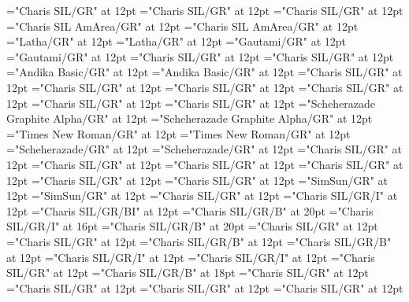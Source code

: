 \documentclass[a4paper,twoside]{article}
\begin{document}
\font\spanshhZxxxxaudio="Charis SIL/GR" at 12pt
\font\divshh="Charis SIL/GR" at 12pt
\font\spanshh="Charis SIL/GR" at 12pt
\font\divstp="Charis SIL AmArea/GR" at 12pt
\font\spanstp="Charis SIL AmArea/GR" at 12pt
\font\divta="Latha/GR" at 12pt
\font\spanta="Latha/GR" at 12pt
\font\divte="Gautami/GR" at 12pt
\font\spante="Gautami/GR" at 12pt
\font\divth="Charis SIL/GR" at 12pt
\font\spanth="Charis SIL/GR" at 12pt
\font\divtpi="Andika Basic/GR" at 12pt
\font\spantpi="Andika Basic/GR" at 12pt
\font\divtrfonipaxemic="Charis SIL/GR" at 12pt
\font\spantrfonipaxemic="Charis SIL/GR" at 12pt
\font\divtrfonipa="Charis SIL/GR" at 12pt
\font\spantrfonipa="Charis SIL/GR" at 12pt
\font\divtr="Charis SIL/GR" at 12pt
\font\spantr="Charis SIL/GR" at 12pt
\font\divurArab="Scheherazade Graphite Alpha/GR" at 12pt
\font\spanurArab="Scheherazade Graphite Alpha/GR" at 12pt
\font\divurxind="Times New Roman/GR" at 12pt
\font\spanurxind="Times New Roman/GR" at 12pt
\font\divur="Scheherazade/GR" at 12pt
\font\spanur="Scheherazade/GR" at 12pt
\font\divvi="Charis SIL/GR" at 12pt
\font\spanvi="Charis SIL/GR" at 12pt
\font\divxas="Charis SIL/GR" at 12pt
\font\spanxas="Charis SIL/GR" at 12pt
\font\divzhCNpinyin="Charis SIL/GR" at 12pt
\font\spanzhCNpinyin="Charis SIL/GR" at 12pt
\font\divzhCN="SimSun/GR" at 12pt
\font\spanzhCN="SimSun/GR" at 12pt
\font\scrBookscrBody="Charis SIL/GR" at 12pt
\font\scrBookNamezxxscrBookscrBody="Charis SIL/GR/I" at 12pt
\font\scrBookCodezxxscrBookscrBody="Charis SIL/GR/BI" at 12pt
\font\TitleMainscrBookscrBody="Charis SIL/GR/B" at 20pt
\font\TitleSecondaryzxxTitleMainscrBookscrBody="Charis SIL/GR/I" at 16pt
\font\spanzxxTitleMainscrBookscrBody="Charis SIL/GR/B" at 20pt
\font\columnsscrBookscrBody="Charis SIL/GR" at 12pt
\font\scrSectioncolumnsscrBookscrBody="Charis SIL/GR" at 12pt
\font\SectionHeadscrSectioncolumnsscrBookscrBody="Charis SIL/GR/B" at 12pt
\font\spanzxxSectionHeadscrSectioncolumnsscrBookscrBody="Charis SIL/GR/B" at 12pt
\font\ParallelPassageReferencescrSectioncolumnsscrBookscrBody="Charis SIL/GR/I" at 12pt
\font\spanzxxParallelPassageReferencescrSectioncolumnsscrBookscrBody="Charis SIL/GR/I" at 12pt
\font\ParagraphscrSectioncolumnsscrBookscrBody="Charis SIL/GR" at 12pt
\font\ChapterNumberzxxParagraphscrSectioncolumnsscrBookscrBody="Charis SIL/GR/B" at 18pt
\font\VerseNumberzxxParagraphscrSectioncolumnsscrBookscrBody="Charis SIL/GR" at 12pt
\font\spanzxxParagraphscrSectioncolumnsscrBookscrBody="Charis SIL/GR" at 12pt
\font\scrFootnoteMarkerParagraphscrSectioncolumnsscrBookscrBody="Charis SIL/GR" at 12pt
\font\NoteGeneralParagraphParagraphscrSectioncolumnsscrBookscrBody="Charis SIL/GR" at 12pt
\end{document}
